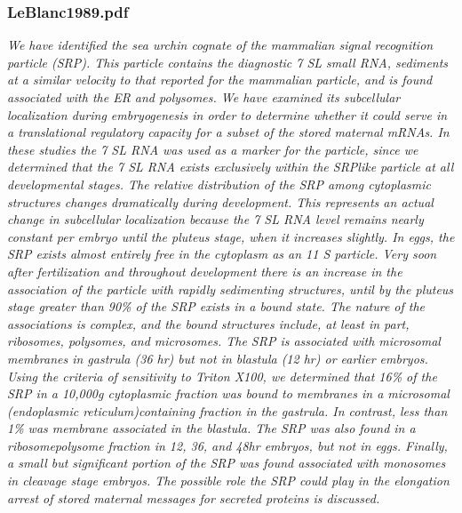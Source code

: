 \documentclass[graybox]{svmult}
\begin{document}
\subsubsection{LeBlanc1989.pdf}

\cite{LEBLANC1989}
\textit{We have identified the sea urchin cognate of the mammalian signal recognition particle (SRP).
This particle contains the diagnostic 7 SL small RNA, sediments at a similar velocity to that
reported for the mammalian particle, and is found associated with the ER and polysomes. We
have examined its subcellular localization during embryogenesis in order to determine whether
it could serve in a translational regulatory capacity for a subset of the stored maternal mRNAs.
In these studies the 7 SL RNA was used as a marker for the particle, since we determined that
the 7 SL RNA exists exclusively within the SRPlike
particle at all developmental stages. The
relative distribution of the SRP among cytoplasmic structures changes dramatically during
development. This represents an actual change in subcellular localization because the 7 SL
RNA level remains nearly constant per embryo until the pluteus stage, when it increases
slightly. In eggs, the SRP exists almost entirely free in the cytoplasm as an 11 S particle. Very
soon after fertilization and throughout development there is an increase in the association of the particle with rapidly sedimenting structures, until by the pluteus stage greater than 90\% of the
SRP exists in a bound state. The nature of the associations is complex, and the bound
structures include, at least in part, ribosomes, polysomes, and microsomes. The SRP is
associated with microsomal membranes in gastrula (36 hr) but not in blastula (12 hr) or earlier
embryos. Using the criteria of sensitivity to Triton X100,
we determined that 16\% of the SRP in
a 10,000g cytoplasmic fraction was bound to membranes in a microsomal (endoplasmic
reticulum)containing
fraction in the gastrula. In contrast, less than 1\% was membrane
associated in the blastula. The SRP was also found in a ribosomepolysome
fraction in 12, 36, and 48hr embryos, but not in eggs. Finally, a small but significant portion of the SRP was found
associated with monosomes in cleavage stage embryos. The possible role the SRP could play
in the elongation arrest of stored maternal messages for secreted proteins is discussed.}




\end{document}
